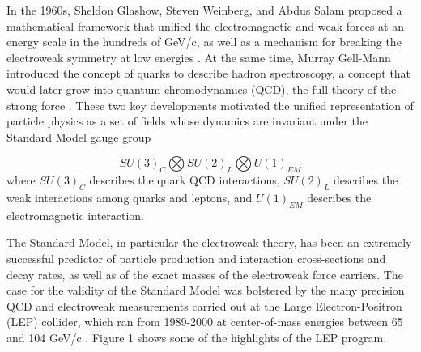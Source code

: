 \documentclass[12pt, letterpaper]{report}
\begin{document}
In the 1960s, Sheldon Glashow, Steven Weinberg, and Abdus Salam proposed a mathematical framework that unified the electromagnetic and weak forces at an energy scale in the hundreds of GeV/c, as well as a mechanism for breaking the electroweak symmetry at low energies \cite{Glashow_Weinberg_and_Salam}.  At the same time, Murray Gell-Mann introduced the concept of quarks to describe hadron spectroscopy, a concept that would later grow into quantum chromodynamics (QCD), the full theory of the strong force \cite{Gell-Mann}.  These two key developments motivated the unified representation of particle physics as a set of fields whose dynamics are invariant under the Standard Model gauge group

\begin{equation}
SU(3)_{C} \bigotimes SU(2)_{L} \bigotimes U(1)_{EM}
\end{equation}
%
where $SU(3)_{C}$ describes the quark QCD interactions, $SU(2)_{L}$ describes the weak interactions among quarks and leptons, and $U(1)_{EM}$ describes the electromagnetic interaction.

The Standard Model, in particular the electroweak theory, has been an extremely successful predictor of particle production and interaction cross-sections and decay rates, as well as of the exact masses of the electroweak force carriers.  The case for the validity of the Standard Model was bolstered by the many precision QCD and electroweak measurements carried out at the Large Electron-Positron (LEP) collider, which ran from 1989-2000 at center-of-mass energies between 65 and 104 GeV/c \cite{Drees}.  Figure 1 shows some of the highlights of the LEP program.
\end{document}
